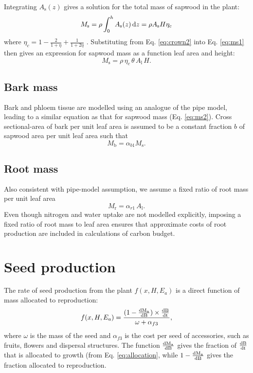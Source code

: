 \documentclass[10pt,twoside]{article}
\begin{document}
Integrating \(A_\textrm{s}(z)\) gives a solution for the total mass of
sapwood in the plant:
\begin{equation}\label{eq:ms1}
M_\textrm{s} = \rho \int_0^h  A_\textrm{s}(z) \, {\rm d}z = \rho  A_\textrm{s} H \eta_c
\end{equation}
where \(\eta_c = 1 - \frac{2}{1 + \eta} + \frac{1}{1 + 2\eta}\)
\citep{Yokozawa-1995}. Substituting from Eq. \ref{eq:crown2} into Eq.
\ref{eq:ms1} then gives an expression for sapwood mass as a function
leaf area and height:
\begin{equation}\label{eq:ms2}
M_\textrm{s} = \rho \, \eta_c \, \theta \, A_\textrm{l} \, H.
\end{equation}

\subsection{Bark mass}\label{bark-mass}

Bark and phloem tissue are modelled using an analogue of the pipe model,
leading to a similar equation as that for sapwood mass (Eq.
\ref{eq:ms2}). Cross sectional-area of bark per unit leaf area is
assumed to be a constant fraction \(b\) of sapwood area per unit leaf
area such that
\begin{equation}\label{eq:mb}
M_\textrm{b} = \alpha_{b1} M_\textrm{s}.
\end{equation}

\subsection{Root mass}\label{root-mass}

Also consistent with pipe-model assumption, we assume a fixed ratio of
root mass per unit leaf area
\begin{equation}\label{eq:mr}
M_\textrm{r} = \alpha_{r1} \, A_\textrm{l}.
\end{equation}
Even though nitrogen and water uptake are not modelled explicitly,
imposing a fixed ratio of root mass to leaf area ensures that
approximate costs of root production are included in calculations of
carbon budget.

\section{Seed production}\label{seed-production}

The rate of seed production from the plant \(f(x, H, E_a)\) is a direct
function of mass allocated to reproduction:
\begin{equation}\label{eq:fecundity}
f(x, H, E_a) = \frac{(1 - \frac{\rm{d}M_\textrm{a}}{\rm{d}B}) \times \frac{\rm{d}B}{\rm{d}t}}{
  \omega + \alpha_{f3}},
\end{equation}
where \(\omega\) is the mass of the seed and \(\alpha_{f3}\) is the cost
per seed of accessories, such as fruits, flowers and dispersal
structures. The function $\frac{\rm{d}M_\textrm{a}}{\rm{d}B}$ gives the fraction
of $\frac{\rm{d}B}{\rm{d}t}$ that is allocated to growth (from Eq. \ref{eq:allocation}, while
$1-\frac{\rm{d}M_\textrm{a}}{\rm{d}B}$ gives the fraction allocated
to reproduction.
\end{document}
